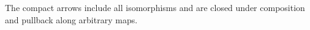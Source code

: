 \documentclass[a4paper,11pt]{amsart}
\begin{document}
\begin{lem}\label{lem:compact-closure}
	The compact arrows include all isomorphisms and are closed under composition and pullback along arbitrary maps.  
\end{lem}

%	
%
%
%	
\end{document}
